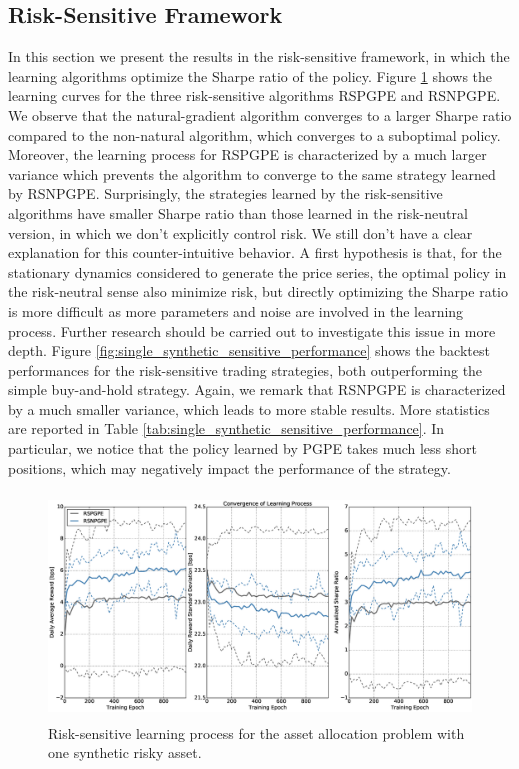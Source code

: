 \subsection{Risk-Sensitive Framework}
In this section we present the results in the risk-sensitive framework, in which the learning algorithms optimize the Sharpe ratio of the policy. Figure \ref{fig:single_synthetic_sensitive_convergence} shows the learning curves for the three risk-sensitive algorithms \gls{RSPGPE} and \gls{RSNPGPE}. We observe that the natural-gradient algorithm converges to a larger Sharpe ratio compared to the non-natural algorithm, which converges to a suboptimal policy. Moreover, the learning process for \gls{RSPGPE} is characterized by a much larger variance which prevents the algorithm to converge to the same strategy learned by \gls{RSNPGPE}. Surprisingly, the strategies learned by the risk-sensitive algorithms have smaller Sharpe ratio than those learned in the risk-neutral version, in which we don't explicitly control risk. We still don't have a clear explanation for this counter-intuitive behavior. A first hypothesis is that, for the stationary dynamics considered to generate the price series, the optimal policy in the risk-neutral sense also minimize risk, but directly optimizing the Sharpe ratio is more difficult as more parameters and noise are involved in the learning process. Further research should be carried out to investigate this issue in more depth. Figure \ref{fig:single_synthetic_sensitive_performance} shows the backtest performances for the risk-sensitive trading strategies, both outperforming the simple buy-and-hold strategy. Again, we remark that \gls{RSNPGPE} is characterized by a much smaller variance, which leads to more stable results. More statistics are reported in Table \ref{tab:single_synthetic_sensitive_performance}. In particular, we notice that the policy learned by \gls{PGPE} takes much less short positions, which may negatively impact the performance of the strategy.

\begin{figure}[t!]
	\centering
	\includegraphics[height=6cm,width=1.0\textwidth]{Images/8_4_single_synthetic_sensitive_convergence}
	\caption[Risk-sensitive learning process for one synthetic risky asset.]{Risk-sensitive learning process for the asset allocation problem with one synthetic risky asset.}
	\label{fig:single_synthetic_sensitive_convergence}
\end{figure}

